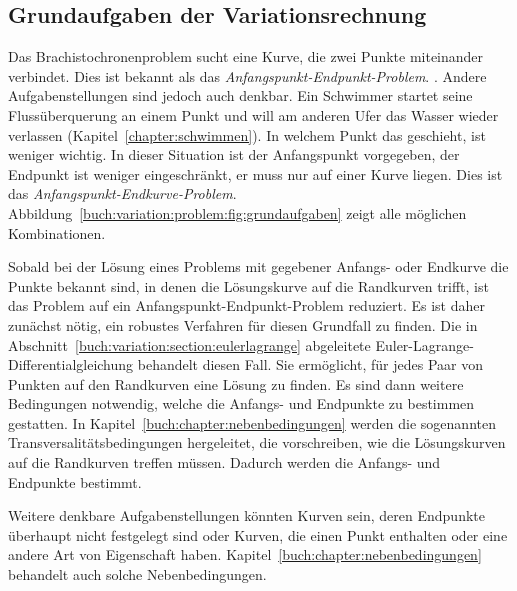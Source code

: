 %
%
\subsection{Grundaufgaben der Variationsrechnung
\label{buch:variation:subsection:grundaufgaben}}

Das Brachistochronenproblem sucht eine Kurve, die zwei Punkte miteinander
verbindet.
Dies ist bekannt als das {\em Anfangspunkt-Endpunkt-Problem}.
.
Andere Aufgabenstellungen sind jedoch auch denkbar.
Ein Schwimmer startet seine Flussüberquerung an einem Punkt
und will am anderen Ufer das Wasser wieder verlassen
(Kapitel~\ref{chapter:schwimmen}).
In welchem Punkt das geschieht, ist weniger wichtig.
In dieser Situation ist der Anfangspunkt vorgegeben, der Endpunkt ist
weniger eingeschränkt, er muss nur auf einer Kurve liegen.
Dies ist das {\em Anfangspunkt-Endkurve-Problem}.
Abbildung~\ref{buch:variation:problem:fig:grundaufgaben}
zeigt alle möglichen Kombinationen.

Sobald bei der Lösung eines Problems mit gegebener Anfangs- oder Endkurve
die Punkte bekannt sind, in denen die Lösungskurve auf die Randkurven
trifft, ist das Problem auf ein Anfangspunkt-Endpunkt-Problem reduziert.
Es ist daher zunächst nötig, ein robustes Verfahren für diesen Grundfall
zu finden.
Die in Abschnitt~\ref{buch:variation:section:eulerlagrange}
abgeleitete Euler-Lagrange-Differentialgleichung behandelt diesen
Fall.
Sie ermöglicht, für jedes Paar von Punkten auf den Randkurven
eine Lösung zu finden.
Es sind dann weitere Bedingungen notwendig, welche die Anfangs- und
Endpunkte zu bestimmen gestatten.
In Kapitel~\ref{buch:chapter:nebenbedingungen} werden die sogenannten
Transversalitätsbedingungen hergeleitet, die vorschreiben, wie die
Lösungskurven auf die Randkurven treffen müssen.
Dadurch werden die Anfangs- und Endpunkte bestimmt.

Weitere denkbare Aufgabenstellungen könnten Kurven sein, deren Endpunkte
überhaupt nicht festgelegt sind oder Kurven, die einen Punkt enthalten
oder eine andere Art von Eigenschaft haben.
Kapitel~\ref{buch:chapter:nebenbedingungen} behandelt auch solche
Nebenbedingungen.


